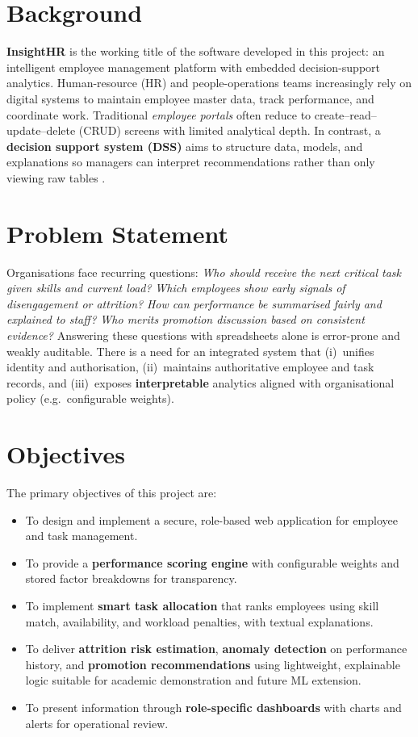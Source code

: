 \section{Background}
\textbf{InsightHR} is the working title of the software developed in this project: an intelligent employee management platform with embedded decision-support analytics. Human-resource (HR) and people-operations teams increasingly rely on digital systems to maintain employee master data, track performance, and coordinate work. Traditional \emph{employee portals} often reduce to create--read--update--delete (CRUD) screens with limited analytical depth. In contrast, a \textbf{decision support system (DSS)} aims to structure data, models, and explanations so managers can interpret recommendations rather than only viewing raw tables \cite{power2002}.

\section{Problem Statement}
Organisations face recurring questions: \emph{Who should receive the next critical task given skills and current load?} \emph{Which employees show early signals of disengagement or attrition?} \emph{How can performance be summarised fairly and explained to staff?} \emph{Who merits promotion discussion based on consistent evidence?} Answering these questions with spreadsheets alone is error-prone and weakly auditable. There is a need for an integrated system that (i)~unifies identity and authorisation, (ii)~maintains authoritative employee and task records, and (iii)~exposes \textbf{interpretable} analytics aligned with organisational policy (e.g.\ configurable weights).

\section{Objectives}
The primary objectives of this project are:
\begin{itemize}
  \item To design and implement a secure, role-based web application for employee and task management.
  \item To provide a \textbf{performance scoring engine} with configurable weights and stored factor breakdowns for transparency.
  \item To implement \textbf{smart task allocation} that ranks employees using skill match, availability, and workload penalties, with textual explanations.
  \item To deliver \textbf{attrition risk estimation}, \textbf{anomaly detection} on performance history, and \textbf{promotion recommendations} using lightweight, explainable logic suitable for academic demonstration and future ML extension.
  \item To present information through \textbf{role-specific dashboards} with charts and alerts for operational review.
\end{itemize}

